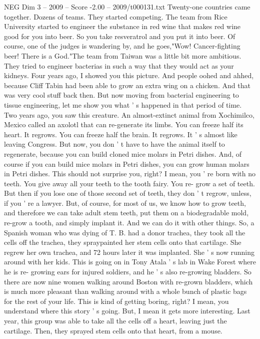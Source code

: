 \begin{textsample}{NEG Dim 3 – 2009 – Score -2.00 – 2009/t000131.txt}
Twenty-one countries came together.
Dozens of teams.
They started competing.
The team from Rice University started to engineer the substance in red wine that makes red wine good for you into beer.
So you take resveratrol and you put it into beer.
Of course, one of the judges is wandering by, and he goes,"Wow!
Cancer-fighting beer!
There is a God."The team from Taiwan was a little bit more ambitious.
They tried to engineer bacterias in such a way that they would act as your kidneys.
Four years ago, I showed you this picture.
And people oohed and ahhed, because Cliff Tabin had been able to grow an extra wing on a chicken.
And that was very cool stuff back then.
But now moving from bacterial engineering to tissue engineering, let me show you what ' s happened in that period of time.
Two years ago, you saw this creature.
An almost-extinct animal from Xochimilco, Mexico called an axolotl that can re-generate its limbs.
You can freeze half its heart.
It regrows.
You can freeze half the brain.
It regrows.
It ' s almost like leaving Congress.
But now, you don ' t have to have the animal itself to regenerate, because you can build cloned mice molars in Petri dishes.
And, of course if you can build mice molars in Petri dishes, you can grow human molars in Petri dishes.
This should not surprise you, right?
I mean, you ' re born with no teeth.
You give away all your teeth to the tooth fairy.
You re- grow a set of teeth.
But then if you lose one of those second set of teeth, they don ' t regrow, unless, if you ' re a lawyer.
But, of course, for most of us, we know how to grow teeth, and therefore we can take adult stem teeth, put them on a biodegradable mold, re-grow a tooth, and simply implant it.
And we can do it with other things.
So, a Spanish woman who was dying of T.
B. had a donor trachea, they took all the cells off the trachea, they spraypainted her stem cells onto that cartilage.
She regrew her own trachea, and 72 hours later it was implanted.
She ' s now running around with her kids.
This is going on in Tony Atala ' s lab in Wake Forest where he is re- growing ears for injured soldiers, and he ' s also re-growing bladders.
So there are now nine women walking around Boston with re-grown bladders, which is much more pleasant than walking around with a whole bunch of plastic bags for the rest of your life.
This is kind of getting boring, right?
I mean, you understand where this story ' s going.
But, I mean it gets more interesting.
Last year, this group was able to take all the cells off a heart, leaving just the cartilage.
Then, they sprayed stem cells onto that heart, from a mouse.

\end{textsample}

